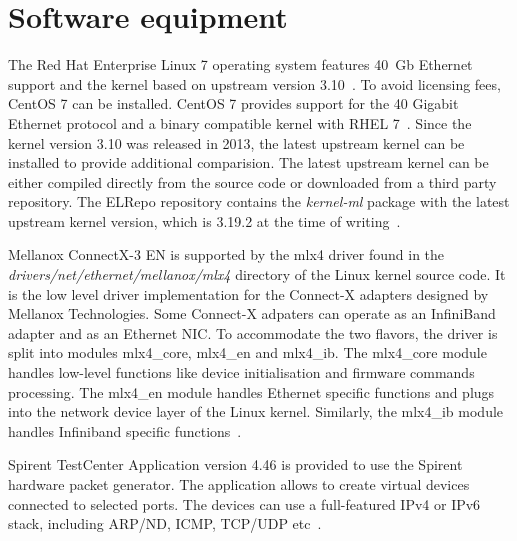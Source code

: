 
\section{Software equipment}\label{sec:analysis-software}
The Red Hat Enterprise Linux 7 operating system features 40~Gb Ethernet support and
the kernel based on upstream version 3.10~\cite{rhel-7-announce}.
To avoid licensing fees, CentOS 7 can be installed.
CentOS 7 provides support for the 40 Gigabit Ethernet protocol and a binary compatible kernel with RHEL 7~\cite{centos-7-announce}.
Since the kernel version 3.10 was released in 2013, the latest upstream kernel can be installed
to provide additional comparision.
The latest upstream kernel can be either compiled directly from the source code or downloaded from a third party repository.
The ELRepo repository contains the {\it{kernel-ml}} package
with the latest upstream kernel version, which is 3.19.2 at the time of writing~\cite{elrepo-kernel-ml}.

Mellanox ConnectX-3 EN is supported by the mlx4 driver found in the
{\it{drivers/net/ethernet/mellanox/mlx4}} directory of the Linux kernel source code.
It is the low level driver implementation for the Connect-X adapters designed by Mellanox Technologies.
Some Connect-X adpaters can operate as an InfiniBand adapter and as an Ethernet NIC.
To accommodate the two flavors, the driver is split into modules mlx4\_core, mlx4\_en and mlx4\_ib.
The mlx4\_core module handles low-level functions like device initialisation and firmware commands processing.
The mlx4\_en module handles Ethernet specific functions and
plugs into the network device layer of the Linux kernel.
Similarly, the mlx4\_ib module handles Infiniband specific functions~\cite{mellanox-user-manual}.

Spirent TestCenter Application version 4.46 is provided to use the Spirent hardware packet generator.
The application allows to create virtual devices connected to selected ports.
The devices can use a full-featured IPv4 or IPv6 stack, including ARP/ND, ICMP, TCP/UDP etc~\cite{spirent-app}.
